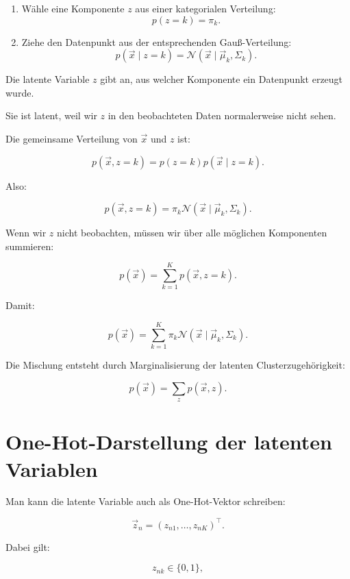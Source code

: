 \begin{enumerate}
    \item Wähle eine Komponente \(z\) aus einer kategorialen Verteilung:
    \[
        p(z=k)=\pi_k.
    \]

    \item Ziehe den Datenpunkt aus der entsprechenden Gauß-Verteilung:
    \[
        p(\vec{x}\mid z=k)
        =
        \mathcal{N}(\vec{x}\mid\vec{\mu}_k,\Sigma_k).
    \]
\end{enumerate}

\begin{definitionbox}
Die latente Variable \(z\) gibt an, aus welcher Komponente ein Datenpunkt erzeugt wurde.

Sie ist latent, weil wir \(z\) in den beobachteten Daten normalerweise nicht sehen.
\end{definitionbox}

Die gemeinsame Verteilung von \(\vec{x}\) und \(z\) ist:

\[
    p(\vec{x},z=k)
    =
    p(z=k)p(\vec{x}\mid z=k).
\]

Also:

\[
    p(\vec{x},z=k)
    =
    \pi_k
    \mathcal{N}(\vec{x}\mid\vec{\mu}_k,\Sigma_k).
\]

Wenn wir \(z\) nicht beobachten, müssen wir über alle möglichen Komponenten summieren:

\[
    p(\vec{x})
    =
    \sum_{k=1}^{K}
    p(\vec{x},z=k).
\]

Damit:

\[
    p(\vec{x})
    =
    \sum_{k=1}^{K}
    \pi_k
    \mathcal{N}(\vec{x}\mid\vec{\mu}_k,\Sigma_k).
\]

\begin{conceptbox}
Die Mischung entsteht durch Marginalisierung der latenten Clusterzugehörigkeit:

\[
    p(\vec{x})
    =
    \sum_{z}
    p(\vec{x},z).
\]
\end{conceptbox}

\section{One-Hot-Darstellung der latenten Variablen}

Man kann die latente Variable auch als One-Hot-Vektor schreiben:

\[
    \vec{z}_n
    =
    (z_{n1},\dots,z_{nK})^{\top}.
\]

Dabei gilt:

\[
    z_{nk}\in\{0,1\},
\]

